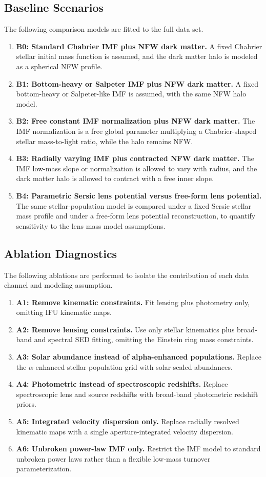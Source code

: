 \documentclass{article}
\begin{document}
\subsection{Baseline Scenarios}
The following comparison models are fitted to the full data set.

\begin{enumerate}
    \item \textbf{B0: Standard Chabrier IMF plus NFW dark matter.} A fixed Chabrier stellar initial mass function is assumed, and the dark matter halo is modeled as a spherical NFW profile.
    \item \textbf{B1: Bottom-heavy or Salpeter IMF plus NFW dark matter.} A fixed bottom-heavy or Salpeter-like IMF is assumed, with the same NFW halo model.
    \item \textbf{B2: Free constant IMF normalization plus NFW dark matter.} The IMF normalization is a free global parameter multiplying a Chabrier-shaped stellar mass-to-light ratio, while the halo remains NFW.
    \item \textbf{B3: Radially varying IMF plus contracted NFW dark matter.} The IMF low-mass slope or normalization is allowed to vary with radius, and the dark matter halo is allowed to contract with a free inner slope.
    \item \textbf{B4: Parametric Sersic lens potential versus free-form lens potential.} The same stellar-population model is compared under a fixed Sersic stellar mass profile and under a free-form lens potential reconstruction, to quantify sensitivity to the lens mass model assumptions.
\end{enumerate}

\subsection{Ablation Diagnostics}
The following ablations are performed to isolate the contribution of each data channel and modeling assumption.

\begin{enumerate}
    \item \textbf{A1: Remove kinematic constraints.} Fit lensing plus photometry only, omitting IFU kinematic maps.
    \item \textbf{A2: Remove lensing constraints.} Use only stellar kinematics plus broad-band and spectral SED fitting, omitting the Einstein ring mass constraints.
    \item \textbf{A3: Solar abundance instead of alpha-enhanced populations.} Replace the $\alpha$-enhanced stellar-population grid with solar-scaled abundances.
    \item \textbf{A4: Photometric instead of spectroscopic redshifts.} Replace spectroscopic lens and source redshifts with broad-band photometric redshift priors.
    \item \textbf{A5: Integrated velocity dispersion only.} Replace radially resolved kinematic maps with a single aperture-integrated velocity dispersion.
    \item \textbf{A6: Unbroken power-law IMF only.} Restrict the IMF model to standard unbroken power laws rather than a flexible low-mass turnover parameterization.
\end{enumerate}
\end{document}
